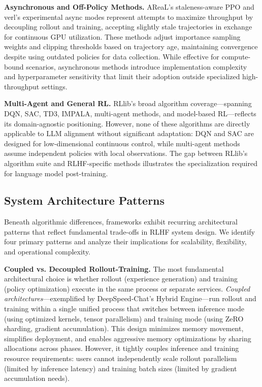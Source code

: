 \documentclass[conference]{IEEEtran}
\begin{document}
\textbf{Asynchronous and Off-Policy Methods.} AReaL's staleness-aware PPO and verl's experimental async modes represent attempts to maximize throughput by decoupling rollout and training, accepting slightly stale trajectories in exchange for continuous GPU utilization. These methods adjust importance sampling weights and clipping thresholds based on trajectory age, maintaining convergence despite using outdated policies for data collection. While effective for compute-bound scenarios, asynchronous methods introduce implementation complexity and hyperparameter sensitivity that limit their adoption outside specialized high-throughput settings.

\textbf{Multi-Agent and General RL.} RLlib's broad algorithm coverage—spanning DQN, SAC, TD3, IMPALA, multi-agent methods, and model-based RL—reflects its domain-agnostic positioning. However, none of these algorithms are directly applicable to LLM alignment without significant adaptation: DQN and SAC are designed for low-dimensional continuous control, while multi-agent methods assume independent policies with local observations. The gap between RLlib's algorithm suite and RLHF-specific methods illustrates the specialization required for language model post-training.

\subsection{System Architecture Patterns}

Beneath algorithmic differences, frameworks exhibit recurring architectural patterns that reflect fundamental trade-offs in RLHF system design. We identify four primary patterns and analyze their implications for scalability, flexibility, and operational complexity.

\textbf{Coupled vs. Decoupled Rollout-Training.} The most fundamental architectural choice is whether rollout (experience generation) and training (policy optimization) execute in the same process or separate services. \textit{Coupled architectures}—exemplified by DeepSpeed-Chat's Hybrid Engine—run rollout and training within a single unified process that switches between inference mode (using optimized kernels, tensor parallelism) and training mode (using ZeRO sharding, gradient accumulation). This design minimizes memory movement, simplifies deployment, and enables aggressive memory optimizations by sharing allocations across phases. However, it tightly couples inference and training resource requirements: users cannot independently scale rollout parallelism (limited by inference latency) and training batch sizes (limited by gradient accumulation needs).
\end{document}
